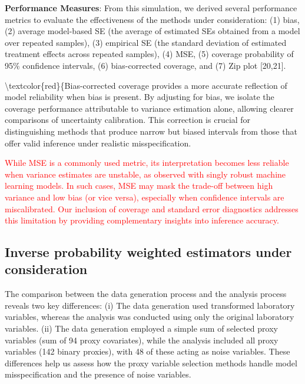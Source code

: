 \documentclass[10pt,letterpaper]{article}
\begin{document}
\textbf{Performance Measures}: From this simulation, we derived several
performance metrics to evaluate the effectiveness of the methods under
consideration: (1) bias, (2) average model-based SE (the average of
estimated SEs obtained from a model over repeated samples), (3)
empirical SE (the standard deviation of estimated treatment effects
across repeated samples), (4) MSE, (5) coverage probability of 95\%
confidence intervals, (6) bias-corrected coverage, and (7) Zip plot
{[}20,21{]}.

\textbackslash textcolor\{red\}\{Bias-corrected coverage provides a more
accurate reflection of model reliability when bias is present. By
adjusting for bias, we isolate the coverage performance attributable to
variance estimation alone, allowing clearer comparisons of uncertainty
calibration. This correction is crucial for distinguishing methods that
produce narrow but biased intervals from those that offer valid
inference under realistic misspecification.

\textcolor{red}{While MSE is a commonly used metric, its interpretation becomes less reliable when variance estimates are unstable, as observed with singly robust machine learning models. In such cases, MSE may mask the trade-off between high variance and low bias (or vice versa), especially when confidence intervals are miscalibrated. Our inclusion of coverage and standard error diagnostics addresses this limitation by providing complementary insights into inference accuracy.}

\subsection*{Inverse probability weighted estimators under
consideration}\label{inverse-probability-weighted-estimators-under-consideration}

The comparison between the data generation process and the analysis
process reveals two key differences: (i) The data generation used
transformed laboratory variables, whereas the analysis was conducted
using only the original laboratory variables. (ii) The data generation
employed a simple sum of selected proxy variables (sum of 94 proxy
covariates), while the analysis included all proxy variables (142 binary
proxies), with 48 of these acting as noise variables. These differences
help us assess how the proxy variable selection methods handle model
misspecification and the presence of noise variables.
\end{document}
